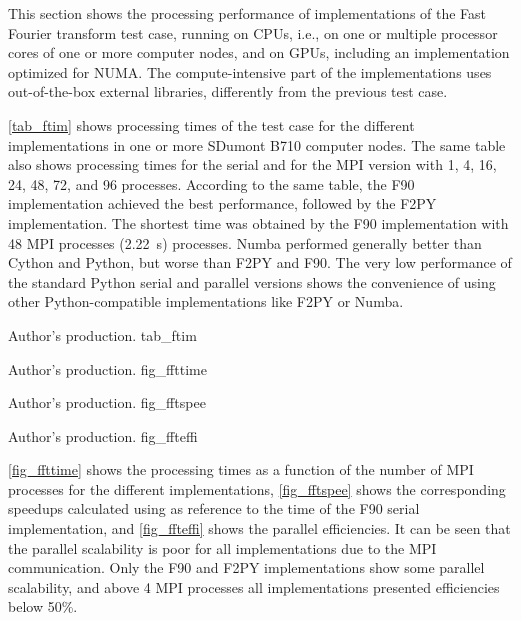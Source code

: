 This section shows the processing performance of implementations of the Fast Fourier transform test case, running on CPUs, i.e., on one or multiple processor cores of one or more computer nodes, and on GPUs, including an implementation optimized for NUMA. The compute-intensive part of the implementations uses out-of-the-box external libraries, differently from the previous test case.

\autoref {tab_ftim} shows processing times of the test case for the different implementations in one or more SDumont B710 computer nodes. The same table also shows processing times for the serial and for the MPI version with 1, 4, 16, 24, 48, 72, and 96 processes. According to the same table, the F90 implementation achieved the best performance, followed by the F2PY implementation. The shortest time was obtained by the F90 implementation with 48 MPI processes (2.22~s) processes. Numba performed generally better than Cython and Python, but worse than F2PY and F90. The very low performance of the standard Python serial and parallel versions shows the convenience of using other Python-compatible implementations like F2PY or Numba. 

     {Author's production.} {tab_ftim}

     {Author's production.} {fig_ffttime}

     {Author's production.} {fig_fftspee}

     {Author's production.} {fig_ffteffi}

\autoref {fig_ffttime} shows the processing times as a function of the number of MPI processes for the different implementations, \autoref {fig_fftspee} shows the corresponding speedups calculated using as reference to the time of the F90 serial implementation, and \autoref {fig_ffteffi} shows the parallel efficiencies. It can be seen that the parallel scalability is poor for all implementations due to the MPI communication. Only the F90 and F2PY implementations show some parallel scalability, and above 4 MPI processes all implementations presented efficiencies below 50\%.  


